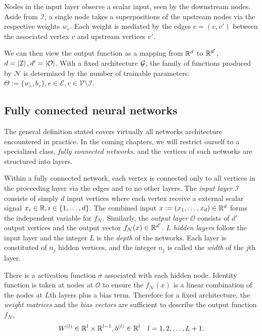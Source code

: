 Nodes in the input layer observe a scalar input, seen by the downstream nodes.
Aside from $\mathcal{I}$, a single node takes a superpositions of the upstream
nodes via the respective weights $w_e$. Each weight is mediated by the edges $e
= (v, v')$ between the associated vertex $v$ and upstream vertices $v'$. 

We can then view the output function as a mapping from $\mathbb{R}^d$ to $\mathbb{R}^{d'}$, $d =
\left| \mathcal{I} \right|, d' = \left| \mathcal{O} \right|$. With a fixed architecture
$\mathcal{G}$, the family of functions produced by $\mathcal{N}$ is determined by
the number of trainable parameters: $\Theta := \{w_e,b_v\}, e \in \mathcal{E}, v
\in \mathcal{V} \setminus \mathcal{I}$.

\subsection{Fully connected neural networks}

The general definition stated covers virtually all networks architecture
encountered in practice. In the coming chapters, we will restrict ourself to a
specialized class, \textit{fully connected networks}. and the vertices of such
networks are structured into layers.

Within a fully connected network, each vertex is connected only to all vertices
in the proceeding layer via the edges and to no other layers. The \textit{input
layer} $\mathcal{I}$ consists of simply $d$ input vertices where each vertex
receive a external scalar signal $x_i \in \mathbb{R}, i \in \{1, \dots, d\}$. The
combined input $x := (x_1, \dots, x_d) \in \mathbb{R}^d$ forms the independent variable
for $f_{\mathcal{N}}$. Similarly, the \textit{output layer} $\mathcal{O}$
consists of $d'$ output vertices and the output vector $f_{\mathcal{N}}(x) \in
\mathbb{R}^{d'}$. $L$ \textit{hidden layers} follow the input layer and the integer $L$
is the \textit{depth} of the networks. Each layer is constituted of $n_j$ hidden
vertices, and the integer $n_j$ is called the \textit{width} of the $j$th layer. 

There is a activation function $\sigma$ associated with each hidden node.
Identity function is taken at nodes at $\mathcal{O}$ to ensure the
$f_{\mathcal{N}}(x)$ is a linear combination of the nodes at $L$th layers plus a
bias term. Therefore for a fixed architecture, the \textit{weight matrices} and
the \textit{bias vectors} are sufficient to describe the output function
$f_{\mathcal{N}}$, 
\begin{equation}
    W^{(l)} \in \mathbb{R}^l \times \mathbb{R}^{l-1}, b^{(l)} \in \mathbb{R}^l 
    \quad l = 1, 2, \dots, L+1.
\end{equation}

